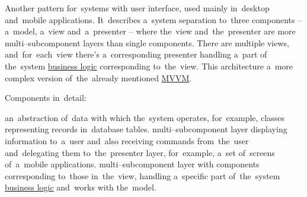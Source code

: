 Another pattern for~systems with user interface, used mainly in~desktop and~mobile applications.
It~describes a~system separation to~three components -- a~model, a~view and~a~presenter -- where the~view and~the~presenter are more multi--subcomponent layers than single components.
There are multiple views, and~for~each~view there's a~corresponding presenter handling a~part of the~system \hyperref[businesslogic]{business logic} corresponding to~the~view.
This architecture a~more complex version of~the~already mentioned \hyperref[mvvm]{MVVM}.
\newline

\noindent Components in~detail:
\begin{itemize}
     an~abstraction of~data with which the~system operates, for~example, classes representing records in~database tables.
     multi--subcomponent layer displaying information to~a~user and~also receiving commands from~the~user and~delegating them to~the~presenter layer, for~example, a~set of~screens of~a~mobile applications.
     multi--subcomponent layer with components corresponding to~those in~the~view, handling a~specific part of~the~system \hyperref[businesslogic]{business logic} and~works with the~model.
\end{itemize}

